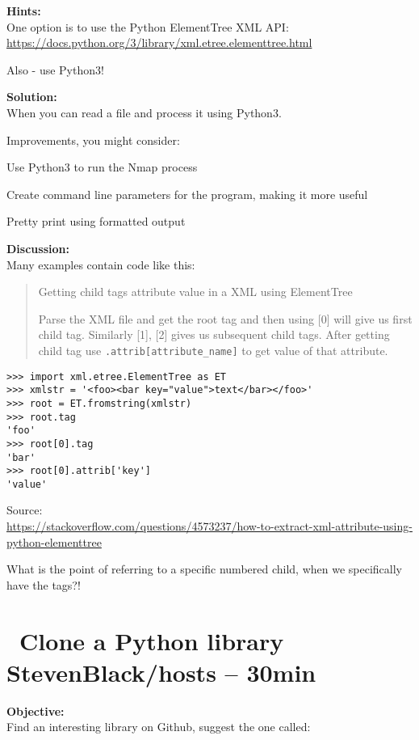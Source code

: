 \documentclass[a4paper,11pt,notitlepage]{report}
\begin{document}
{\bf Hints:}\\
One option is to use the Python ElementTree XML API:\\
\url{https://docs.python.org/3/library/xml.etree.elementtree.html}

Also - use Python3!

{\bf Solution:}\\
When you can read a file and process it using Python3.

Improvements, you might consider:
\begin{list2}
\item Use Python3 to run the Nmap process
\item Create command line parameters for the program, making it more useful
\item Pretty print using formatted output
\end{list2}
{\bf Discussion:}\\
Many examples contain code like this:

\begin{quote}
Getting child tags attribute value in a XML using ElementTree

Parse the XML file and get the root tag and then using [0] will give us first child tag. Similarly [1], [2] gives us subsequent child tags. After getting child tag use \verb+.attrib[attribute_name]+ to get value of that attribute.
\end{quote}

\begin{verbatim}
>>> import xml.etree.ElementTree as ET
>>> xmlstr = '<foo><bar key="value">text</bar></foo>'
>>> root = ET.fromstring(xmlstr)
>>> root.tag
'foo'
>>> root[0].tag
'bar'
>>> root[0].attrib['key']
'value'
\end{verbatim}
Source:\\{\footnotesize \url{https://stackoverflow.com/questions/4573237/how-to-extract-xml-attribute-using-python-elementtree}}

What is the point of referring to a specific numbered child, when we specifically have the tags?!

\chapter{\faInfoCircle\ Clone a Python library StevenBlack/hosts -- 30min}
\label{ex:git-clone-XX}

{\bf Objective:}\\
Find an interesting library on Github, suggest the one called:
\end{document}
